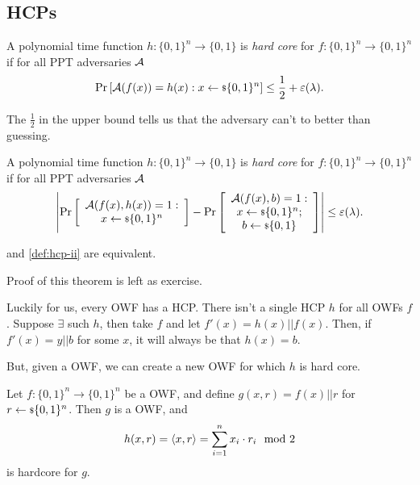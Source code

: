 \subsection{\aclp{HCP}}

\begin{definition} \label{def:hcp-i}
	A polynomial time function $h : \{0,1\}^{n} \to \{0,1\}$ is \emph{hard core} for $f : \{0,1\}^{n} \to \{0,1\}^{n}$ if for all \ac{PPT} adversaries $\mathcal{A}$
	\begin{equation*}
		\mathop{\mathrm{Pr}}\limits_{} \left[ {\mathcal{A}(f(x)) = h(x) : x \leftarrow {\scriptstyle \$} {\{0,1\}^{n}}} \right] \le \frac{1}{2} + \varepsilon(\lambda).
	\end{equation*}
\end{definition}
The $\frac{1}{2}$ in the upper bound tells us that the adversary can't to better than guessing.

\begin{definition} \label{def:hcp-ii}
	A polynomial time function $h : \{0,1\}^{n} \to \{0,1\}$ is \emph{hard core} for $f : \{0,1\}^{n} \to \{0,1\}^{n}$ if for all \ac{PPT} adversaries $\mathcal{A}$
	\begin{equation*}
		\left|{
			\mathop{\mathrm{Pr}}\limits_{} \left[ {
			\begin{array}{c}
				\mathcal{A}(f(x), h(x)) = 1 : \\
				x \leftarrow {\scriptstyle \$} {\{0,1\}^{n}}
			\end{array}
			} \right]
			-
			\mathop{\mathrm{Pr}}\limits_{} \left[ {
			\begin{array}{c}
				\mathcal{A}(f(x), b) = 1 : \\
				x \leftarrow {\scriptstyle \$} {\{0,1\}^{n}}; \\
				b \leftarrow {\scriptstyle \$} {\{0,1\}}
			\end{array}
			} \right]
		}\right|
		\le
		\varepsilon(\lambda).
	\end{equation*}
\end{definition}

\begin{theorem}
	 and \cref{def:hcp-ii} are equivalent.
\end{theorem}
Proof of this theorem is left as exercise.

Luckily for us, every \ac{OWF} has a \ac{HCP}.
There isn't a single \ac{HCP} $h$ for all \acp{OWF} $f$.
Suppose $\exists$ such $h$, then take $f$ and let $f'(x) = h(x) || f(x)$.
Then, if $f'(x) = y || b$ for some $x$, it will always be that $h(x) = b$.

But, given a \ac{OWF}, we can create a new \ac{OWF} for which $h$ is hard core.

\begin{theorem}[\ac{GL}, 1983] \label{thm:gl}
	Let $f : \{0,1\}^n \to \{0,1\}^{n}$ be a \ac{OWF}, and define $g(x,r) = f(x) || r$ for $r \leftarrow {\scriptstyle \$} {\{0,1\}^{n}}$.
	Then $g$ is a \ac{OWF}, and 
	\begin{equation*}
		h(x,r) = \left< {x}, {r} \right> = \sum_{i=1}^{n} x_i \cdot r_i \mod 2
	\end{equation*}
	is hardcore for $g$. 
\end{theorem}

